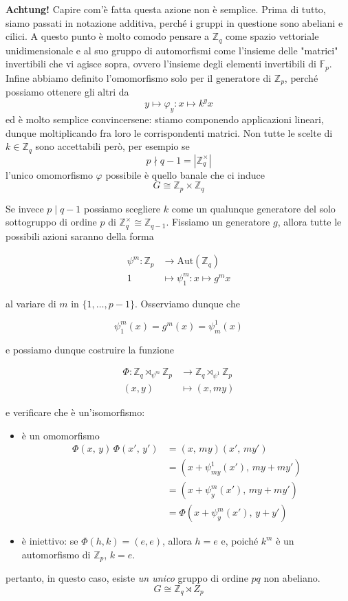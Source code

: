 \documentclass[a4paper]{article}
\theoremstyle{remark}
\theoremstyle{definition}
\newcommand{\Aut}[1]{\mathrm{Aut}\left( #1 \right)}
\newcommand{\Z}{\mathbb{Z}}
\newcommand{\fun}[5]{
	\begin{align*}
	#1 \colon #2 &\to #3 \\
	#4 &\mapsto #5
	\end{align*}
}
\begin{document}
\begin{multicols}{2}
\textbf{Achtung!} Capire com'è fatta questa azione non è semplice. Prima di tutto, siamo passati in notazione additiva, perché i gruppi in questione sono abeliani e cilici. A questo punto è molto comodo pensare a $ \Z_q $ come spazio vettoriale unidimensionale e al suo gruppo di automorfismi come l'insieme delle "matrici" invertibili che vi agisce sopra, ovvero l'insieme degli elementi invertibili di $ \mathbb{F}_p $. Infine abbiamo definito l'omomorfismo solo per il generatore di $ \Z_p $, perché possiamo ottenere gli altri da
\[ y \mapsto \varphi_y : x \mapsto k^yx \]
ed è molto semplice convincersene: stiamo componendo applicazioni lineari, dunque moltiplicando fra loro le corrispondenti matrici.
Non tutte le scelte di $ k \in \Z_q $ sono accettabili però, per esempio se 
$$  p \nmid q-1 = |\Z_q^\times| $$
l'unico omomorfismo $ \varphi $ possibile è quello banale che ci induce
\[ \boxed{G \cong \Z_p \times \Z_q} \]

Se invece 
$ p \mid q -1 $
possiamo scegliere $ k $ come un qualunque generatore del solo sottogruppo di ordine $ p $ di $ \Z_q^\times \cong \Z_{q-1} $. Fissiamo un generatore $ g $, allora tutte le possibili azioni saranno della forma

\fun{\psi^m}{\Z_p}{\Aut{\Z_q}}{1}{\psi^m_{1}: x \mapsto g^mx}
al variare di $ m $ in $ \{1, \dots, p-1\} $.
Osserviamo dunque che

\[ \psi^m_1(x) = g^{m}(x) = \psi^1_m(x) \]


e possiamo dunque costruire la funzione
\fun{\Phi}{\Z_q \rtimes_{\psi^m} \Z_p}{\Z_q \rtimes_{\psi^1} \Z_p}{(x, y)}{(x, my)}
e verificare che è un'isomorfismo:
\begin{itemize}
	\item è un omomorfismo
	\begin{align*} \Phi(x,\, y)\,\Phi(x',\, y') &= (x,\, my)(x',\, my') \\&= (x + \psi_{my}^1(x'), \,my + my')
	\\&= (x + \psi_y^{m}(x'),\, my + my') \\&= \Phi(x + \psi^m_y(x'),\, y + y')  \end{align*} 
	\item è iniettivo: se $ \Phi(h, k) = (e, e) $, allora $ h = e $ e, poiché $ k^m $ è un automorfismo di $ \Z_p $, $ k = e $.
\end{itemize}
pertanto, in questo caso, esiste \emph{un unico} gruppo di ordine $ pq $ non abeliano. 
\[ \boxed{G \cong \Z_q \rtimes Z_p} \]



\end{multicols}
\end{document}
